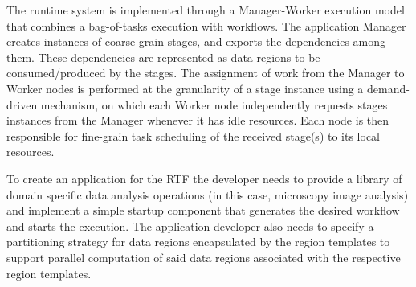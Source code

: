 
The runtime system is implemented through a Manager-Worker execution model that combines a bag-of-tasks execution with workflows. The application Manager creates instances of coarse-grain stages, and exports the dependencies among them. These dependencies are represented as data regions to be consumed/produced by the stages. The assignment of work from the Manager to Worker nodes is performed at the granularity of a stage instance using a demand-driven mechanism, on which each Worker node independently requests stages instances from the Manager whenever it has idle resources. Each node is then responsible for fine-grain task scheduling of the received stage(s) to its local resources.

To create an application for the RTF the developer needs to provide a library of domain specific data analysis operations (in this case, microscopy image analysis) and implement a simple startup component that generates the desired workflow and starts the execution. The application developer also needs to specify a partitioning strategy for data regions encapsulated by the region templates to support parallel computation of said data regions associated with the respective region templates.


